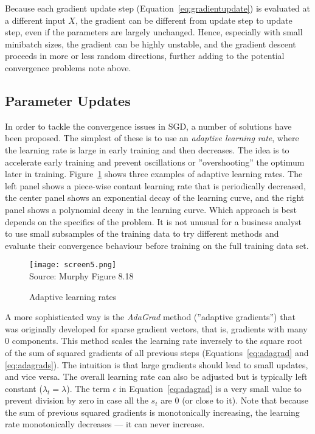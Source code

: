 Because each gradient update step (Equation~\ref{eq:gradientupdate}) is evaluated at a different input $X$, the gradient can be different from update step to update step, even if the parameters are largely unchanged. Hence, especially with small minibatch sizes, the gradient can be highly unstable, and the gradient descent proceeds in more or less random directions, further adding to the potential convergence problems note above.

\subsection{Parameter Updates}

In order to tackle the convergence issues in SGD, a number of solutions have been proposed. The simplest of these is to use an \emph{adaptive learning rate}, where the learning rate is large in early training and then decreases. The idea is to accelerate early training and prevent oscillations or ''overshooting'' the optimum later in training. Figure~\ref{fig:screen5_chap15} shows three examples of adaptive learning rates. The left panel shows a piece-wise contant learning rate that is periodically decreased, the center panel shows an exponential decay of the learning curve, and the right panel shows a polynomial decay in the learning curve. Which approach is best depends on the specifics of the problem. It is not unusual for a business analyst to use small subsamples of the training data to try different methods and evaluate their convergence behaviour before training on the full training data set.

\begin{figure}
\texttt{[image: screen5.png]} \\

\scriptsize Source: Murphy Figure 8.18
\caption{Adaptive learning rates}
\label{fig:screen5_chap15}
\end{figure}

A more sophisticated way is the \emph{AdaGrad} method (''adaptive gradients'') that was originally developed for sparse gradient vectors, that is, gradients with many $0$ components. This method scales the learning rate inversely to the square root of the sum of squared gradients of all previous steps (Equations~\ref{eq:adagrad} and \ref{eq:adagrads}). The intuition is that large gradients should lead to small updates, and vice versa. The overall learning rate can also be adjusted but is typically left constant ($\lambda_t = \lambda$). The term $\epsilon$ in Equation~\ref{eq:adagrad} is a very small value to prevent division by zero in case all the $s_t$ are 0 (or close to it). Note that because the sum of previous squared gradients is monotonically increasing, the learning rate monotonically decreases --- it can never increase.

